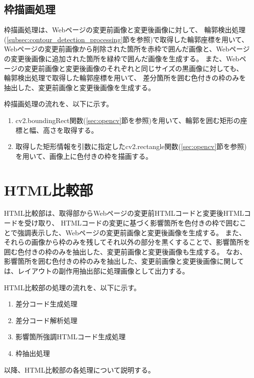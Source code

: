 \subsection{枠描画処理}\label{subsec:Bounding box drawing process}
枠描画処理は、Webページの変更前画像と変更後画像に対して、
輪郭検出処理(\ref{subsec:contour_detection_processing}節を参照)で取得した輪郭座標を用いて、
Webページの変更前画像から削除された箇所を赤枠で囲んだ画像と、Webページの変更後画像に追加された箇所を緑枠で囲んだ画像を生成する。
また、Webページの変更前画像と変更後画像のそれぞれと同じサイズの黒画像に対しても、
輪郭検出処理で取得した輪郭座標を用いて、
差分箇所を囲む色付きの枠のみを抽出した、変更前画像と変更後画像を生成する。
\par
枠描画処理の流れを、以下に示す。
\begin{enumerate}
    \item cv2.boundingRect関数(\ref{sec:opencv}節を参照)を用いて、輪郭を囲む矩形の座標と幅、高さを取得する。
    \item 取得した矩形情報を引数に指定したcv2.rectangle関数(\ref{sec:opencv}節を参照)を用いて、画像上に色付きの枠を描画する。
\end{enumerate}


\section{HTML比較部}\label{sec:Affected_area_extraction}
HTML比較部は、取得部からWebページの変更前HTMLコードと変更後HTMLコードを受け取り、
HTMLコードの変更に基づく影響箇所を色付きの枠で囲むことで強調表示した、Webページの変更前画像と変更後画像を生成する。
また、それらの画像から枠のみを残してそれ以外の部分を黒くすることで、影響箇所を囲む色付きの枠のみを抽出した、変更前画像と変更後画像も生成する。
なお、影響箇所を囲む色付きの枠のみを抽出した、変更前画像と変更後画像に関しては、レイアウトの副作用抽出部に処理画像として出力する。
\par
HTML比較部の処理の流れを、以下に示す。
\begin{enumerate}
    \item 差分コード生成処理
    \item 差分コード解析処理
    \item 影響箇所強調HTMLコード生成処理
    \item 枠抽出処理
\end{enumerate}
以降、HTML比較部の各処理について説明する。

